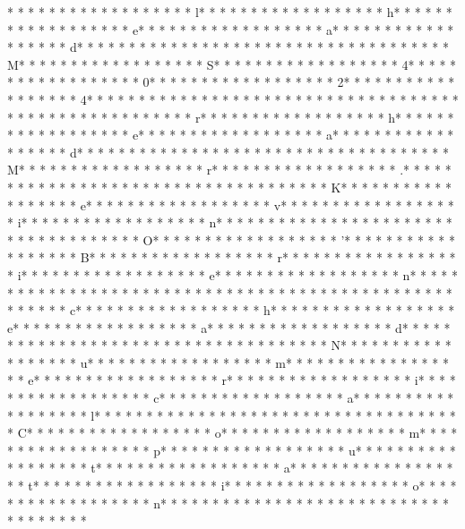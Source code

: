 * * *  * * *  * * *  *  * * *  *  * * *  * l* * *  * * *  * * *  *  * * *  *  * * *  * h* * *  * * *  * * *  *  * * *  *  * * *  * e* * *  * * *  * * *  *  * * *  *  * * *  * a* * *  * * *  * * *  *  * * *  *  * * *  * d* * *  * * *  * * *  *  * * *  *  * * *  * {* * *  * * *  * * *  *  * * *  *  * * *  * M* * *  * * *  * * *  *  * * *  *  * * *  * S* * *  * * *  * * *  *  * * *  *  * * *  * 4* * *  * * *  * * *  *  * * *  *  * * *  * 0* * *  * * *  * * *  *  * * *  *  * * *  * 2* * *  * * *  * * *  *  * * *  *  * * *  * 4* * *  * * *  * * *  *  * * *  *  * * *  * }* * *  * * *  * * *  *  * * *  *  * * *  *  * * *  * * *  * * *  *  * * *  *  * * *  * r* * *  * * *  * * *  *  * * *  *  * * *  * h* * *  * * *  * * *  *  * * *  *  * * *  * e* * *  * * *  * * *  *  * * *  *  * * *  * a* * *  * * *  * * *  *  * * *  *  * * *  * d* * *  * * *  * * *  *  * * *  *  * * *  * {* * *  * * *  * * *  *  * * *  *  * * *  * M* * *  * * *  * * *  *  * * *  *  * * *  * r* * *  * * *  * * *  *  * * *  *  * * *  * .* * *  * * *  * * *  *  * * *  *  * * *  *  * * *  * * *  * * *  *  * * *  *  * * *  * K* * *  * * *  * * *  *  * * *  *  * * *  * e* * *  * * *  * * *  *  * * *  *  * * *  * v* * *  * * *  * * *  *  * * *  *  * * *  * i* * *  * * *  * * *  *  * * *  *  * * *  * n* * *  * * *  * * *  *  * * *  *  * * *  *  * * *  * * *  * * *  *  * * *  *  * * *  * O* * *  * * *  * * *  *  * * *  *  * * *  * '* * *  * * *  * * *  *  * * *  *  * * *  * B* * *  * * *  * * *  *  * * *  *  * * *  * r* * *  * * *  * * *  *  * * *  *  * * *  * i* * *  * * *  * * *  *  * * *  *  * * *  * e* * *  * * *  * * *  *  * * *  *  * * *  * n* * *  * * *  * * *  *  * * *  *  * * *  * }* * *  * * *  * * *  *  * * *  *  * * *  * 
* * *  * * *  * * *  *  * * *  *  * * *  * c* * *  * * *  * * *  *  * * *  *  * * *  * h* * *  * * *  * * *  *  * * *  *  * * *  * e* * *  * * *  * * *  *  * * *  *  * * *  * a* * *  * * *  * * *  *  * * *  *  * * *  * d* * *  * * *  * * *  *  * * *  *  * * *  * {* * *  * * *  * * *  *  * * *  *  * * *  * N* * *  * * *  * * *  *  * * *  *  * * *  * u* * *  * * *  * * *  *  * * *  *  * * *  * m* * *  * * *  * * *  *  * * *  *  * * *  * e* * *  * * *  * * *  *  * * *  *  * * *  * r* * *  * * *  * * *  *  * * *  *  * * *  * i* * *  * * *  * * *  *  * * *  *  * * *  * c* * *  * * *  * * *  *  * * *  *  * * *  * a* * *  * * *  * * *  *  * * *  *  * * *  * l* * *  * * *  * * *  *  * * *  *  * * *  *  * * *  * * *  * * *  *  * * *  *  * * *  * C* * *  * * *  * * *  *  * * *  *  * * *  * o* * *  * * *  * * *  *  * * *  *  * * *  * m* * *  * * *  * * *  *  * * *  *  * * *  * p* * *  * * *  * * *  *  * * *  *  * * *  * u* * *  * * *  * * *  *  * * *  *  * * *  * t* * *  * * *  * * *  *  * * *  *  * * *  * a* * *  * * *  * * *  *  * * *  *  * * *  * t* * *  * * *  * * *  *  * * *  *  * * *  * i* * *  * * *  * * *  *  * * *  *  * * *  * o* * *  * * *  * * *  *  * * *  *  * * *  * n* * *  * * *  * * *  *  * * *  *  * * *  * }* * *  * * *  * * *  *  * * *  *  * * *  * 
